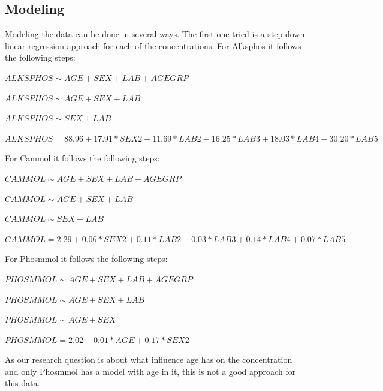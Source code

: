 \documentclass{article}
\begin{document}
    \subsection{Modeling}
      Modeling the data can be done in several ways.
      The first one tried is a step down linear regression approach for each of the concentrations.
      For Alksphos it follows the following steps:
      \begin{itemize}
        \small{\item $ALKSPHOS \sim AGE + SEX + LAB + AGEGRP$}
        \small{\item $ALKSPHOS \sim AGE + SEX + LAB$}
        \small{\item $ALKSPHOS \sim SEX + LAB$}
        \small{\item $ALKSPHOS = 88.96 + 17.91*SEX2 - 11.69*LAB2 - 16.25*LAB3 + 18.03*LAB4 - 30.20*LAB5$}
      \end{itemize}
      For Cammol it follows the following steps:
      \begin{itemize}
        \small{\item $CAMMOL \sim AGE + SEX + LAB + AGEGRP$}
        \small{\item $CAMMOL \sim AGE + SEX + LAB$}
        \small{\item $CAMMOL \sim SEX + LAB$}
        \small{\item $CAMMOL = 2.29 + 0.06*SEX2 + 0.11*LAB2 + 0.03*LAB3 + 0.14*LAB4 + 0.07*LAB5$}
      \end{itemize}
      For Phosmmol it follows the following steps:
      \begin{itemize}
        \small{\item $PHOSMMOL \sim AGE + SEX + LAB + AGEGRP$}
        \small{\item $PHOSMMOL \sim AGE + SEX + LAB$}
        \small{\item $PHOSMMOL \sim AGE + SEX$}
        \small{\item $PHOSMMOL = 2.02 - 0.01*AGE + 0.17*SEX2$}
      \end{itemize}
      As our research question is about what influence age has on the concentration and only Phosmmol has a model with age in it, this is not a good approach for this data.
\end{document}
